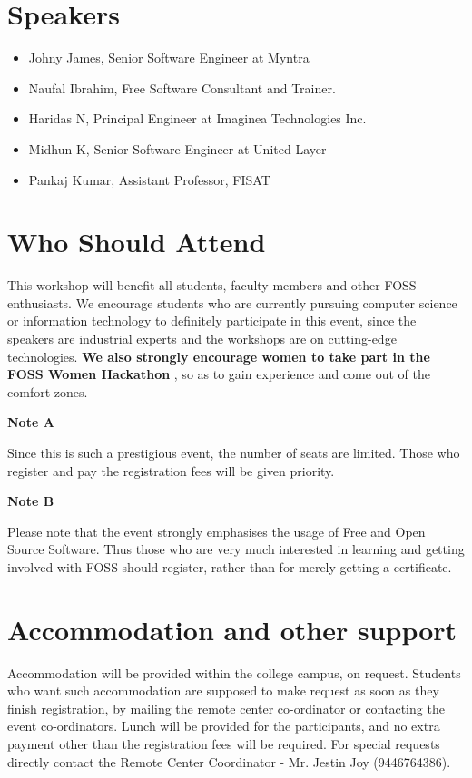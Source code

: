 \documentclass[notuble,10pt,a4paper]{leaflet}
\begin{document}
\section{\Large{Speakers}}

\begin{itemize}
\item Johny James, Senior Software Engineer at Myntra
\item Naufal Ibrahim, Free Software Consultant and Trainer.
\item Haridas N, Principal Engineer at Imaginea Technologies Inc.
\item Midhun K, Senior Software Engineer at United Layer
\item Pankaj Kumar, Assistant Professor, FISAT
\end{itemize}
 
\section{{\Large Who Should Attend}}
This workshop will benefit all students, faculty members and other FOSS enthusiasts. We encourage students who are currently pursuing computer science or information technology to definitely participate in this event, since the speakers are industrial experts and the workshops are on cutting-edge technologies. \textbf{ We also strongly encourage women to take part in the FOSS Women Hackathon }, so as to gain experience and come out of the comfort zones.

\textbf{\newline
Note A}

Since this is such a prestigious event, the number of seats are limited. Those who register and pay the registration fees will be given priority.

\textbf{Note B}

Please note that the event strongly emphasises the usage of Free and Open Source Software. Thus those who are very much interested in learning and getting involved with FOSS should register, rather than for merely getting a certificate.


\section{{\Large Accommodation and other support}}

Accommodation will be provided within the college campus, on request. Students who want such accommodation are supposed to make request as soon as they finish registration, by mailing the remote center co-ordinator or contacting the event co-ordinators. Lunch will be provided for the participants, and no extra payment other than the registration fees will be required. For special requests directly contact the Remote Center Coordinator - Mr. Jestin Joy (9446764386).
\end{document}
